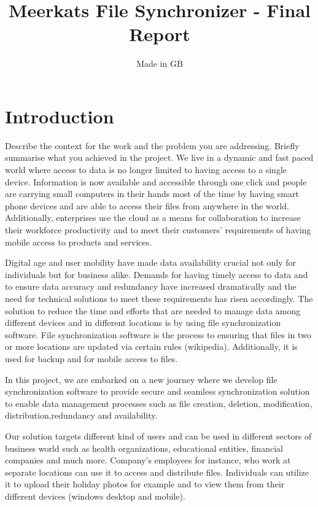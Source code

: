 \documentclass{article}
\title{Meerkats File Synchronizer - Final Report}
\author{Made in GB}
\date{}
\begin{document}
\maketitle{}

\section{Introduction}
Describe the context for the work and the problem you are addressing. Briefly summarise what you achieved in the project. \vfill
\vspace{5mm}
We live in a dynamic and fast paced world where access to data is no longer limited to having access to a single device. Information is now available and accessible through one click and people are carrying small computers in their hands most of the time by having smart phone devices and are able to access their files from anywhere in the world. Additionally, enterprises use the cloud as a means for collaboration to increase their workforce productivity and to meet their customers’ requirements of having mobile access to products and services.

Digital age and user mobility have made data availability crucial not only for individuals but for business alike. Demands for having timely access to data and to ensure data accuracy and redundancy have increased dramatically and the need for technical solutions to meet these requirements has risen accordingly. The solution to reduce the time and efforts that are needed to manage data among different devices and in different locations is by using file synchronization software. File synchronization software is the process to ensuring that files in two or more locations are updated via certain rules (wikipedia). Additionally, it is used for backup and for mobile access to files.

In this project, we are embarked on a new journey where we develop file synchronization software to provide secure and seamless synchronization solution to enable data management processes such as file creation, deletion, modification, distribution,redundancy and availability.

Our solution targets different kind of users and can be used in different sectors of business world such as health organizations, educational entities, financial companies and much more. Company’s employees for instance, who work at separate locations can use it to access and distribute files. Individuals can utilize it to upload their holiday photos for example and to view them from their different devices (windows desktop and mobile).
\end{document}
